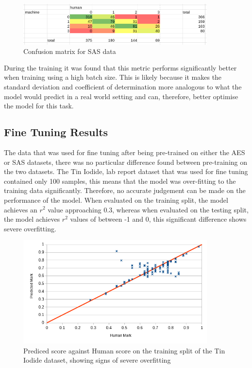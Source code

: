 \documentclass[11pt]{article}
\begin{document}
\begin{figure}[htbp]
\centering
\includegraphics[width=10cm]{./exp5_sas_confusion.png}
\caption{Confusion matrix for SAS data}
\end{figure}

During the training it was found that this metric performs significantly better when training using a high batch size. This is likely because it makes the standard deviation and coefficient of determination more analogous to what the model would predict in a real world setting and can, therefore, better optimise the model for this task.

\subsection{Fine Tuning Results}
\label{sec:orgd225071}
The data that was used for fine tuning after being pre-trained on either the AES or SAS datasets, there was no particular difference found between pre-training on the two datasets. The Tin Iodide, lab report dataset that was used for fine tuning contained only 100 samples, this means that the model was over-fitting to the training data significantly. Therefore, no accurate judgement can be made on the performance of the model. When evaluated on the training split, the model achieves an \(r^2\) value approaching 0.3, whereas when evaluated on the testing split, the model achieves \(r^2\) values of between -1 and 0, this significant difference shows severe overfitting.

\begin{figure}[htbp]
\centering
\includegraphics[width=10cm]{./exp5_fine_dist_train.png}
\caption{Prediced score against Human score on the training split of the Tin Iodide dataset, showing signs of severe overfitting \label{fig:overfit}}
\end{figure}
\end{document}
